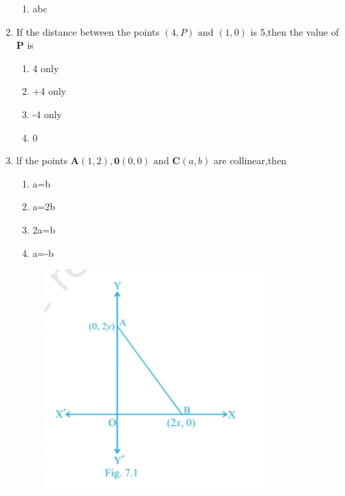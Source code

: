 \documentclass[12pt]{article}
\let\vec\mathbf
\begin{document}
\begin{enumerate}
\begin{enumerate}
\item abc 
\end{enumerate}
\item If the distance between the points $(4,P) \text{ and } (1,0)$ is 5,then the value of $\vec{P}$ is
\begin{enumerate}                       
\item4 only
\item+4 only
\item-4 only
\item0
\end{enumerate}
\item lf the points $\vec{A}(1,2),\vec{0}(0,0)\text{ and }\vec{C}(a,b)$ are collinear,then
\begin{enumerate}
\item a=b
\item a=2b
\item 2a=b
\item a=-b
\end{enumerate}
\begin{figure}[h!]
  \centering
  \includegraphics[width=\columnwidth]{./figs/image.jpg}
  \caption{}
\label{fig:10/7/12Fig1}
\end{figure}

	\end{enumerate}
	
\end{document}
